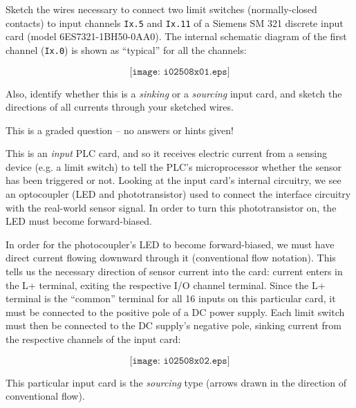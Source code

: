 

Sketch the wires necessary to connect two limit switches (normally-closed contacts) to input channels {\tt Ix.5} and {\tt Ix.11} of a Siemens SM 321 discrete input card (model 6ES7321-1BH50-0AA0).  The internal schematic diagram of the first channel ({\tt Ix.0}) is shown as ``typical'' for all the channels:

$$\texttt{[image: i02508x01.eps]}$$

Also, identify whether this is a {\it sinking} or a {\it sourcing} input card, and sketch the directions of all currents through your sketched wires.

\vfil 

\eject






This is a graded question -- no answers or hints given!







This is an {\it input} PLC card, and so it receives electric current from a sensing device (e.g. a limit switch) to tell the PLC's microprocessor whether the sensor has been triggered or not.  Looking at the input card's internal circuitry, we see an optocoupler (LED and phototransistor) used to connect the interface circuitry with the real-world sensor signal.  In order to turn this phototransistor on, the LED must become forward-biased.

In order for the photocoupler's LED to become forward-biased, we must have direct current flowing downward through it (conventional flow notation).  This tells us the necessary direction of sensor current into the card: current enters in the L+ terminal, exiting the respective I/O channel terminal.  Since the L+ terminal is the ``common'' terminal for all 16 inputs on this particular card, it must be connected to the positive pole of a DC power supply.  Each limit switch must then be connected to the DC supply's negative pole, sinking current from the respective channels of the input card:

$$\texttt{[image: i02508x02.eps]}$$

This particular input card is the {\it sourcing} type (arrows drawn in the direction of conventional flow).




